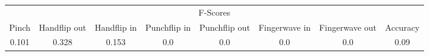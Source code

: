 \documentclass{standalone}
\begin{document}
 
 \begin{tabular}{|c|c|c|c|c|c|c ||c|}
\cline{1-8}\multicolumn{8}{|c|}{F-Scores} \\ 
\cline{1-8}Pinch & Handflip out & Handflip in & Punchflip in & Punchflip out & Fingerwave in & Fingerwave out & Accuracy\\ 
\cline{1-8}0.101 & 0.328 & 0.153 & 0.0 & 0.0 & 0.0 & 0.0 & 0.09\\ 
 \cline{1-8}\hline \end{tabular}
 
\end{document}
